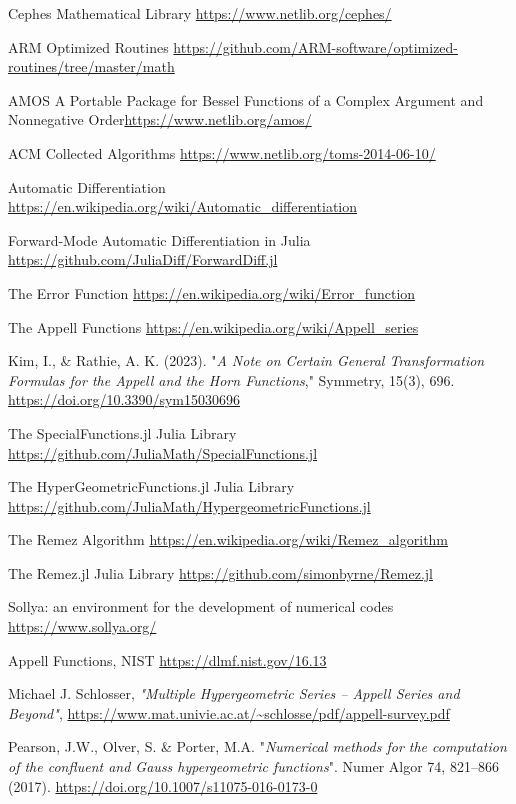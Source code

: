 \documentclass{article}
\theoremstyle{mytheoremstyle}
\theoremstyle{mytheoremstyle}
\theoremstyle{myproblemstyle}
\begin{document}
\begin{thebibliography}{9}
      Cephes Mathematical Library \url{https://www.netlib.org/cephes/}

      ARM Optimized Routines \url{https://github.com/ARM-software/optimized-routines/tree/master/math}

      AMOS A Portable Package for Bessel Functions of a Complex Argument and Nonnegative Order\url{https://www.netlib.org/amos/}

       ACM Collected Algorithms \url{https://www.netlib.org/toms-2014-06-10/}

      Automatic Differentiation \url{https://en.wikipedia.org/wiki/Automatic_differentiation}

      Forward-Mode Automatic Differentiation in {J}ulia \url{https://github.com/JuliaDiff/ForwardDiff.jl}

      The Error Function \url{https://en.wikipedia.org/wiki/Error_function}

      The Appell Functions \url{https://en.wikipedia.org/wiki/Appell_series}


      Kim, I., \& Rathie, A. K. (2023). "\textit{A Note on Certain General Transformation Formulas for the Appell and the Horn Functions}," Symmetry, 15(3), 696. \url{https://doi.org/10.3390/sym15030696}

      
      The SpecialFunctions.jl Julia Library \url{https://github.com/JuliaMath/SpecialFunctions.jl}

      The HyperGeometricFunctions.jl Julia Library \url{https://github.com/JuliaMath/HypergeometricFunctions.jl}

      The Remez Algorithm \url{https://en.wikipedia.org/wiki/Remez_algorithm}

      The Remez.jl Julia Library \url{https://github.com/simonbyrne/Remez.jl}

      Sollya: an environment for the development of numerical codes \url{https://www.sollya.org/}

      Appell Functions, NIST \url{https://dlmf.nist.gov/16.13}

      Michael J. Schlosser, \textit{"Multiple Hypergeometric Series – Appell Series
      and Beyond"}, \url{https://www.mat.univie.ac.at/~schlosse/pdf/appell-survey.pdf}

      Pearson, J.W., Olver, S. \& Porter, M.A. "\textit{Numerical methods for the computation of the confluent and Gauss hypergeometric functions}". Numer Algor 74, 821–866 (2017). \url{https://doi.org/10.1007/s11075-016-0173-0}

   \end{thebibliography}
  
\end{document}
